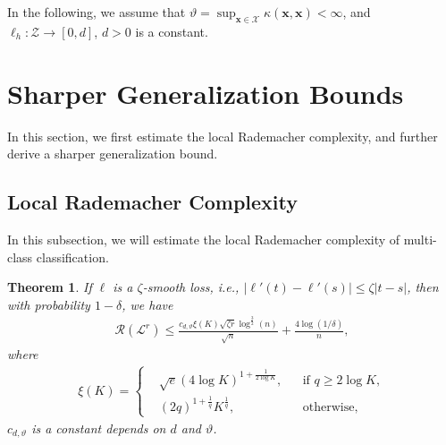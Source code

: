 \documentclass{article}
\newtheorem{theorem}{Theorem}
\begin{document}
In the following, we assume that
$\vartheta=\sup_{\mathbf x\in \mathcal{X}}\kappa(\mathbf x,\mathbf x)< \infty$,
and $\ell_h:\mathcal{Z}\rightarrow [0,d]$,
$d>0$ is a constant.

\section{Sharper Generalization Bounds}
In this section, we first estimate the local Rademacher complexity,
and further derive a sharper generalization bound.

\subsection{Local Rademacher Complexity}
In this subsection, we will estimate the local Rademacher complexity of multi-class classification.
\begin{theorem}
\label{rademacherlocal}
  If $\ell$ is a $\zeta$-smooth loss, i.e., $|\ell'(t)-\ell'(s)|\leq \zeta|t-s|$,
  then with probability $1-\delta$,
  we have
  \begin{align*}
    \mathcal{R}(\mathcal{L}^r) \leq \frac{c_{d,\vartheta}\xi(K)\sqrt{\zeta r}\log^{\frac{3}{2}}(n)}{\sqrt{n}}+\frac{4\log(1/\delta)}{n},
  \end{align*}
  where
  \begin{align*}
  \xi(K)=
  \left\{
      \begin{aligned}
      &\sqrt{e}(4\log K)^{1+\frac{1}{2\log K}}, &&\text{if } q\geq 2\log K,\\
      &(2q)^{1+\frac{1}{q}}K^{\frac{1}{q}}, &&\text{otherwise},
      \end{aligned}
      \right.
  \end{align*}
  $c_{d,\vartheta}$ is a constant depends on $d$ and $\vartheta$.
\end{theorem}
\end{document}
